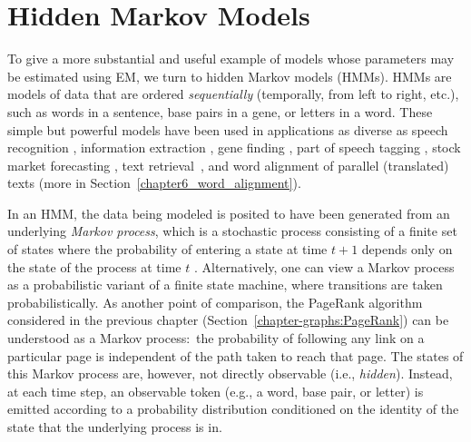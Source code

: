 \section{Hidden Markov Models}
\label{chapter6_hmms}

To give a more substantial and useful example of models whose
parameters may be estimated using EM, we turn to hidden Markov models
(HMMs).  HMMs are models of data that are ordered \emph{sequentially}
(temporally, from left to right, etc.), such as words in a sentence,
base pairs in a gene, or letters in a word.  These simple but powerful
models have been used in applications as diverse as speech recognition
\cite{Jelinek_1997}, information extraction \cite{Seymore_1999}, gene
finding \cite{Stanke_2003}, part of speech tagging
\cite{Cutting_1992}, stock market forecasting \cite{Hassan_2005}, text
retrieval~\cite{MillerD99}, and word alignment of parallel
(translated) texts \cite{Vogel_1996} (more in
Section~\ref{chapter6_word_alignment}).

In an HMM, the data being modeled is posited to have been generated
from an underlying \emph{Markov process}, which is a stochastic
process consisting of a finite set of states where the probability of
entering a state at time $t+1$ depends only on the state of the
process at time $t$ \cite{Ross_1996}.  Alternatively, one can view a
Markov process as a probabilistic variant of a finite state machine,
where transitions are taken probabilistically.  As another point of
comparison, the PageRank algorithm considered in the previous chapter
(Section~\ref{chapter-graphs:PageRank}) can be understood as a Markov
process:\ the probability of following any link on a particular page
is independent of the path taken to reach that page.  The states of
this Markov process are, however, not directly observable (i.e., \emph{
  hidden}).  Instead, at each time step, an observable token (e.g., a
word, base pair, or letter) is emitted according to a probability
distribution conditioned on the identity of the state that the
underlying process is in.

